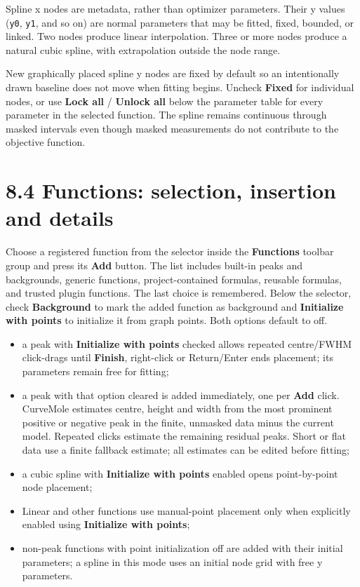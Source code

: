 \documentclass[
  10pt,
  a4paper,
  oneside]{scrreprt}
\providecommand{\tightlist}{%
  \setlength{\itemsep}{0pt}\setlength{\parskip}{0pt}}
\begin{document}
Spline x nodes are metadata, rather than optimizer parameters. Their y
values (\texttt{y0}, \texttt{y1}, and so on) are normal parameters that
may be fitted, fixed, bounded, or linked. Two nodes produce linear
interpolation. Three or more nodes produce a natural cubic spline, with
extrapolation outside the node range.

New graphically placed spline y nodes are fixed by default so an
intentionally drawn baseline does not move when fitting begins. Uncheck
\textbf{Fixed} for individual nodes, or use \textbf{Lock all} /
\textbf{Unlock all} below the parameter table for every parameter in the
selected function. The spline remains continuous through masked
intervals even though masked measurements do not contribute to the
objective function.

\hypertarget{functions-selection-insertion-and-details}{%
\section{8.4 Functions: selection, insertion and
details}\label{functions-selection-insertion-and-details}}

Choose a registered function from the selector inside the
\textbf{Functions} toolbar group and press its \textbf{Add} button. The
list includes built-in peaks and backgrounds, generic functions,
project-contained formulas, reusable formulas, and trusted plugin
functions. The last choice is remembered. Below the selector, check
\textbf{Background} to mark the added function as background and
\textbf{Initialize with points} to initialize it from graph points. Both
options default to off.

\begin{itemize}
\tightlist
\item
  a peak with \textbf{Initialize with points} checked allows repeated
  centre/FWHM click-drags until \textbf{Finish}, right-click or
  Return/Enter ends placement; its parameters remain free for fitting;
\item
  a peak with that option cleared is added immediately, one per
  \textbf{Add} click. CurveMole estimates centre, height and width from
  the most prominent positive or negative peak in the finite, unmasked
  data minus the current model. Repeated clicks estimate the remaining
  residual peaks. Short or flat data use a finite fallback estimate; all
  estimates can be edited before fitting;
\item
  a cubic spline with \textbf{Initialize with points} enabled opens
  point-by-point node placement;
\item
  Linear and other functions use manual-point placement only when
  explicitly enabled using \textbf{Initialize with points};
\item
  non-peak functions with point initialization off are added with their
  initial parameters; a spline in this mode uses an initial node grid
  with free y parameters.
\end{itemize}
\end{document}
